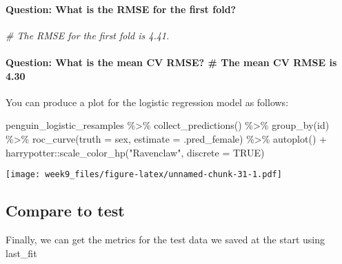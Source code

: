 \documentclass[
]{article}
\newenvironment{Shaded}{\begin{snugshade}}{\end{snugshade}}
\newcommand{\AttributeTok}[1]{\textcolor[rgb]{0.77,0.63,0.00}{#1}}
\newcommand{\CommentTok}[1]{\textcolor[rgb]{0.56,0.35,0.01}{\textit{#1}}}
\newcommand{\ConstantTok}[1]{\textcolor[rgb]{0.00,0.00,0.00}{#1}}
\newcommand{\FunctionTok}[1]{\textcolor[rgb]{0.00,0.00,0.00}{#1}}
\newcommand{\NormalTok}[1]{#1}
\newcommand{\SpecialCharTok}[1]{\textcolor[rgb]{0.00,0.00,0.00}{#1}}
\newcommand{\StringTok}[1]{\textcolor[rgb]{0.31,0.60,0.02}{#1}}
\begin{document}
\hypertarget{question-what-is-the-rmse-for-the-first-fold}{%
\paragraph{Question: What is the RMSE for the first
fold?}\label{question-what-is-the-rmse-for-the-first-fold}}

\begin{Shaded}
\begin{Highlighting}[]
\CommentTok{\# The RMSE for the first fold is 4.41.}
\end{Highlighting}
\end{Shaded}

\hypertarget{question-what-is-the-mean-cv-rmse-the-mean-cv-rmse-is-4.30}{%
\paragraph{Question: What is the mean CV RMSE? \# The mean CV RMSE is
4.30}\label{question-what-is-the-mean-cv-rmse-the-mean-cv-rmse-is-4.30}}

You can produce a plot for the logistic regression model as follows:

\begin{Shaded}
\begin{Highlighting}[]
\NormalTok{penguin\_logistic\_resamples }\SpecialCharTok{\%\textgreater{}\%} 
  \FunctionTok{collect\_predictions}\NormalTok{() }\SpecialCharTok{\%\textgreater{}\%} 
  \FunctionTok{group\_by}\NormalTok{(id) }\SpecialCharTok{\%\textgreater{}\%} 
  \FunctionTok{roc\_curve}\NormalTok{(}\AttributeTok{truth =}\NormalTok{ sex, }\AttributeTok{estimate =}\NormalTok{ .pred\_female) }\SpecialCharTok{\%\textgreater{}\%} 
  \FunctionTok{autoplot}\NormalTok{() }\SpecialCharTok{+}
\NormalTok{  harrypotter}\SpecialCharTok{::}\FunctionTok{scale\_color\_hp}\NormalTok{(}\StringTok{"Ravenclaw"}\NormalTok{, }\AttributeTok{discrete =} \ConstantTok{TRUE}\NormalTok{)}
\end{Highlighting}
\end{Shaded}

\texttt{[image: week9\_files/figure-latex/unnamed-chunk-31-1.pdf]}

\hypertarget{compare-to-test}{%
\subsection{Compare to test}\label{compare-to-test}}

Finally, we can get the metrics for the test data we saved at the start
using last\_fit
\end{document}
